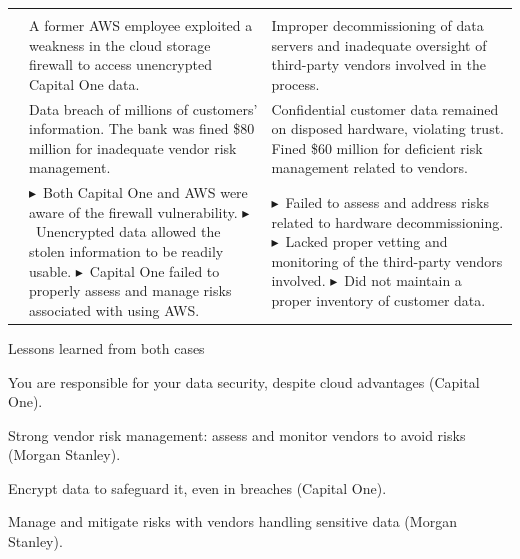 \noindent\begin{minipage}{\textwidth}
\renewcommand{\arraystretch}{1.32}
\begin{tabularx}{\textwidth}{@{}L{0.15\textwidth}YY@{}}
 \thd{} &  & \\
{\tabfont {}} &
{\tabfont A former AWS employee exploited a weakness in the cloud storage
firewall to access unencrypted Capital One data.} &
{\tabfont Improper decommissioning of data servers and inadequate oversight of
third-party vendors involved in the process.}\\
{\tabfont {}} &
{\tabfont Data breach of millions of customers' information. The bank was fined
\$80 million for inadequate vendor risk management.} &
{\tabfont Confidential customer data remained on disposed hardware, violating
trust. Fined \$60 million for deficient risk management related to vendors.}\\
{\tabfont {}} &
{\tabfont
$\blacktriangleright$~Both Capital One and AWS were aware of the firewall
vulnerability.\newline
$\blacktriangleright$~Unencrypted data allowed the stolen information to be
readily usable.\newline
$\blacktriangleright$~Capital One failed to properly assess and manage risks
associated with using AWS.} &
{\tabfont
$\blacktriangleright$~Failed to assess and address risks related to hardware
decommissioning.\newline
$\blacktriangleright$~Lacked proper vetting and monitoring of the third-party
vendors involved.\newline
$\blacktriangleright$~Did not maintain a proper inventory of customer data.}\\
\end{tabularx}
\end{minipage}

\begin{orexambox}{Lessons learned from both cases}
\begin{lettered}
\item You are responsible for your data security, despite cloud advantages
(Capital One).
\item Strong vendor risk management: assess and monitor vendors to avoid risks
(Morgan Stanley).
\item Encrypt data to safeguard it, even in breaches (Capital One).
\item Manage and mitigate risks with vendors handling sensitive data (Morgan
Stanley).
\end{lettered}
\end{orexambox}
